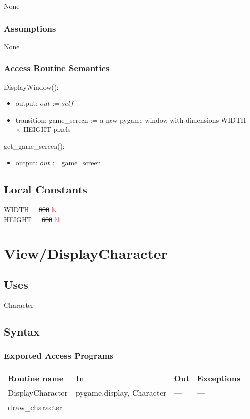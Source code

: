 \documentclass[12pt]{article}
\begin{document}
None

\subsubsection* {Assumptions}

None

\subsubsection* {Access Routine Semantics}

DisplayWindow():
\begin{itemize}
    \item output: $out$ := $self$
    \item transition: game\_screen := a new pygame window with dimensions WIDTH $\times$ HEIGHT pixels
\end{itemize}
\noindent get\_game\_screen():
\begin{itemize}
    \item output: $out$ := game\_screen
\end{itemize}
\subsection* {Local Constants}
WIDTH = \sout{800} \textcolor{red}{$\mathbb{N}$} \\
HEIGHT = \sout{600} \textcolor{red}{$\mathbb{N}$}
\newpage
\section*{View/DisplayCharacter}

\subsection* {Uses}
Character
\subsection* {Syntax}

\subsubsection* {Exported Access Programs}

\begin{tabular}{| l | l | l | l |}
\hline
\textbf{Routine name} & \textbf{In} & \textbf{Out} & \textbf{Exceptions}\\
\hline
    DisplayCharacter & pygame.display, Character & --- & ---\\
\hline
    draw\_character & --- & --- & ---\\
\hline
\end{tabular}
\end{document}
